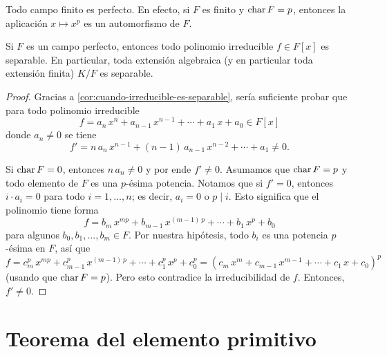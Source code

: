 \begin{ejemplo}
  Todo campo finito es perfecto. En efecto, si $F$ es finito y $\operatorname{char} F = p$,
  entonces la aplicación $x \mapsto x^p$ es un automorfismo de $F$.
\end{ejemplo}

\begin{proposicion}
  Si $F$ es un campo perfecto, entonces todo polinomio irreducible $f \in F [x]$
  es separable. En particular, toda extensión algebraica (y en particular toda
  extensión finita) $K/F$ es separable.

  \begin{proof}
    Gracias a \ref{cor:cuando-irreducible-es-separable}, sería suficiente probar
    que para todo polinomio irreducible
    $$f = a_n\,x^n + a_{n-1}\,x^{n-1} + \cdots + a_1\,x + a_0 \in F [x]$$
    donde $a_n\ne 0$ se tiene
    $$f' = n\,a_n\,x^{n-1} + (n-1)\,a_{n-1}\,x^{n-2} + \cdots + a_1 \ne 0.$$

    Si $\operatorname{char} F = 0$, entonces $n\,a_n \ne 0$ y por ende $f' \ne 0$. Asumamos
    que $\operatorname{char} F = p$ y todo elemento de $F$ es una $p$-ésima potencia. Notamos
    que si $f' = 0$, entonces $i\cdot a_i = 0$ para todo $i = 1,\ldots,n$; es
    decir, $a_i = 0$ o $p\mid i$. Esto significa que el polinomio tiene forma
    $$f = b_m\,x^{mp} + b_{m-1}\,x^{(m-1)\,p} + \cdots + b_1\,x^p + b_0$$
    para algunos $b_0,b_1,\ldots,b_m \in F$. Por nuestra hipótesis, todo $b_i$ es
    una potencia $p$-ésima en $F$, así que
    \[ f = c_m^p\,x^{mp} + c_{m-1}^p\,x^{(m-1)\,p} + \cdots + c_1^p\,x^p + c_0^p
         = (c_m\,x^m + c_{m-1}\,x^{m-1} + \cdots + c_1\,x + c_0)^p \]
    (usando que $\operatorname{char} F = p$). Pero esto contradice la irreducibilidad de
    $f$. Entonces, $f'\ne 0$.
  \end{proof}
\end{proposicion}


\section{Teorema del elemento primitivo}

